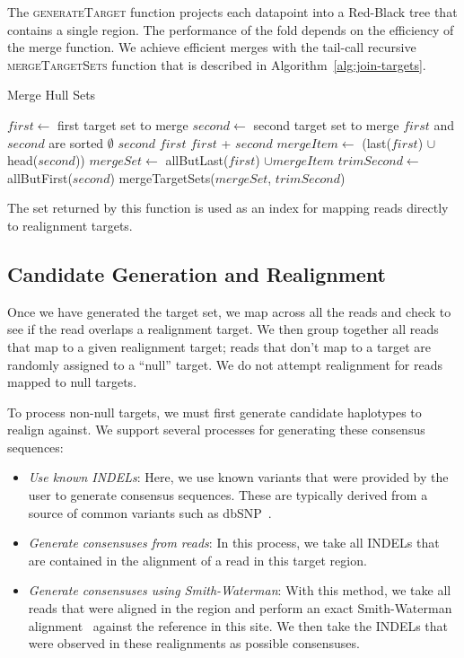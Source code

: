 \documentclass[phd]{ucbthesis}
\begin{document}
The \textsc{generateTarget} function projects each datapoint into a Red-Black tree that contains a
single region. The performance of the fold depends on the efficiency of the merge function. We achieve
efficient merges with the tail-call recursive \textsc{mergeTargetSets} function that is described in
Algorithm~\ref{alg:join-targets}.

\begin{algorithm}
\caption{Merge Hull Sets}
\label{alg:join-targets}
\begin{algorithmic}
\STATE $first \leftarrow$ first target set to merge
\STATE $second \leftarrow$ second target set to merge
\REQUIRE $first$ and $second$ are sorted
\RETURN $\emptyset$
\RETURN $second$
\RETURN $first$
\ELSE
{}
\RETURN $first$ + $second$
\ELSE
\STATE $mergeItem \leftarrow$ (last($first$) $\cup$ head($second$))
\STATE $mergeSet \leftarrow$ allButLast($first$) $\cup mergeItem$
\STATE $trimSecond \leftarrow$ allButFirst($second$)
\RETURN mergeTargetSets($mergeSet$, $trimSecond$)
\ENDIF
\ENDIF
\end{algorithmic}
\end{algorithm}

The set returned by this function is used as an index for mapping reads directly to realignment targets.

\subsection{Candidate Generation and Realignment}
\label{sec:candidate-generation-realignment}

Once we have generated the target set, we map across all the reads and check to see if the read overlaps
a realignment target. We then group together all reads that map to a given realignment target; reads that
don't map to a target are randomly assigned to a ``null'' target. We do not attempt realignment for reads mapped
to null targets.

To process non-null targets, we must first generate candidate haplotypes to realign against. We support several
processes for generating these consensus sequences:

\begin{itemize}
\item \emph{Use known INDELs}: Here, we use known variants that were provided by the user to generate
consensus sequences. These are typically derived from a source of common variants such as dbSNP~\cite{sherry01}.
\item \emph{Generate consensuses from reads}: In this process, we take all INDELs that are contained in
the alignment of a read in this target region.
\item \emph{Generate consensuses using Smith-Waterman}: With this method, we take all reads that were
aligned in the region and perform an exact Smith-Waterman alignment~\cite{smith81} against the reference in this site. We
then take the INDELs that were observed in these realignments as possible consensuses. 
\end{itemize}
\end{document}
